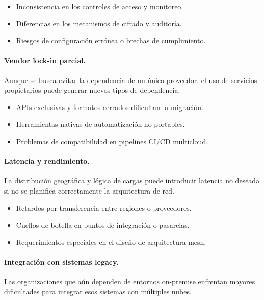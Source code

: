 {            \begin{itemize}
                \item Inconsistencia en los controles de acceso y monitoreo.
                \item Diferencias en los mecanismos de cifrado y auditoría.
                \item Riesgos de configuración errónea o brechas de cumplimiento.
            \end{itemize}
            
            \paragraph{Vendor lock-in parcial.}
            Aunque se busca evitar la dependencia de un único proveedor, el uso de servicios propietarios puede generar nuevos tipos de dependencia.
            
            \begin{itemize}
                \item APIs exclusivas y formatos cerrados dificultan la migración.
                \item Herramientas nativas de automatización no portables.
                \item Problemas de compatibilidad en pipelines CI/CD multicloud.
            \end{itemize}
            
            \paragraph{Latencia y rendimiento.}
            La distribución geográfica y lógica de cargas puede introducir latencia no deseada si no se planifica correctamente la arquitectura de red.
            
            \begin{itemize}
                \item Retardos por transferencia entre regiones o proveedores.
                \item Cuellos de botella en puntos de integración o pasarelas.
                \item Requerimientos especiales en el diseño de arquitectura mesh.
            \end{itemize}
            
            \paragraph{Integración con sistemas legacy.}
            Las organizaciones que aún dependen de entornos on-premise enfrentan mayores dificultades para integrar esos sistemas con múltiples nubes.
            
}

